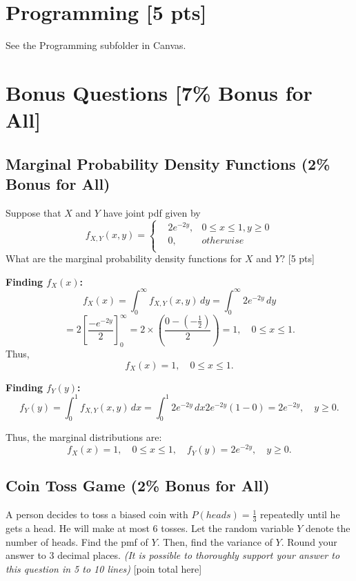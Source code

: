 \documentclass{article}
\begin{document}
\newpage

\section{Programming [5 pts]}
See the Programming subfolder in Canvas.
\newpage

\section{Bonus Questions [7\% Bonus for All]}
\subsection{Marginal Probability Density Functions (2\% Bonus for All)}
Suppose that $X$ and $Y$ have joint pdf given by
$$f_{X,Y}(x,y)=\left\{
\begin{aligned}
    &2e^{-2y}, & 0\leq x\leq1,y\geq0 \\
    &0, & otherwise\\
\end{aligned}\right.$$
What are the marginal probability density functions for $X$ and  $Y$? [5 pts]

\textbf{Finding $f_X(x)$:}
\[
f_X(x) = \int_{0}^{\infty} f_{X,Y}(x,y) \, dy = \int_{0}^{\infty} 2e^{-2y} \, dy
\]
\[
= 2 \left[ \frac{-e^{-2y}}{2} \right]_{0}^{\infty} = 2 \times \left( \frac{0 - (-\frac{1}{2})}{2} \right) = 1, \quad 0 \leq x \leq 1.
\]
Thus, 
\[
f_X(x) = 1, \quad 0 \leq x \leq 1.
\]

\textbf{Finding $f_Y(y)$:}
\[
f_Y(y) = \int_{0}^{1} f_{X,Y}(x,y) \, dx = \int_{0}^{1} 2e^{-2y} \, dx 2e^{-2y} (1 - 0) = 2e^{-2y}, \quad y \geq 0.
\]

Thus, the marginal distributions are:
\[
f_X(x) = 1, \quad 0 \leq x \leq 1, \quad f_Y(y) = 2e^{-2y}, \quad y \geq 0.
\]

\newpage

\subsection{Coin Toss Game (2\% Bonus for All)}
A person decides to toss a biased coin with $P(heads)= \frac{1}{3}$ repeatedly until he gets a head. He will make at most 6 tosses. Let the random variable $Y$ denote the number of heads. Find the pmf of $Y$. Then, find the variance of $Y$. Round your answer to 3 decimal places. \textit{(It is possible to thoroughly support your answer to this question in 5 to 10 lines)} [poin total here]  
\end{document}
